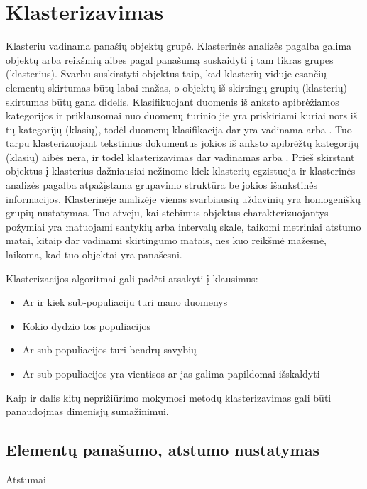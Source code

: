 \documentclass{VUMIFInfKursinis}
\begin{document}
\section{Klasterizavimas}
Klasteriu vadinama panašių objektų grupė. Klasterinės analizės pagalba galima objektų arba reikšmių aibes pagal panašumą suskaidyti į tam tikras grupes (klasterius). Svarbu suskirstyti objektus taip, kad klasterių viduje esančių elementų skirtumas būtų labai mažas, o objektų iš skirtingų grupių (klasterių) skirtumas būtų gana didelis. 
Klasifikuojant duomenis iš anksto apibrėžiamos kategorijos ir priklausomai nuo duomenų turinio jie yra priskiriami kuriai nors iš tų kategorijų (klasių), todėl duomenų klasifikacija dar yra vadinama  arba . Tuo tarpu klasterizuojant tekstinius dokumentus jokios iš anksto apibrėžtų kategorijų (klasių) aibės nėra, ir todėl klasterizavimas dar vadinamas  arba . Prieš skirstant objektus į klasterius dažniausiai nežinome kiek klasterių egzistuoja ir klasterinės analizės pagalba atpažįstama grupavimo struktūra be jokios išankstinės informacijos. 
Klasterinėje analizėje vienas svarbiausių uždavinių yra homogeniškų grupių nustatymas. Tuo atveju, kai stebimus objektus charakterizuojantys požymiai yra matuojami santykių arba intervalų skale, taikomi metriniai atstumo matai, kitaip dar vadinami skirtingumo matais, nes kuo reikšmė mažesnė, laikoma, kad tuo objektai yra panašesni.

Klasterizacijos algoritmai gali padėti atsakyti į klausimus:
\begin{itemize}
	\item Ar ir kiek sub-populiaciju turi mano duomenys
	\item Kokio dydzio tos populiacijos
	\item Ar sub-populiacijos turi bendrų savybių
	\item Ar sub-populiacijos yra vientisos ar jas galima papildomai išskaldyti
\end{itemize}
Kaip ir dalis kitų neprižiūrimo mokymosi metodų klasterizavimas gali būti panaudojmas dimenisjų sumažinimui. 


\subsection{Elementų panašumo, atstumo nustatymas}
Atstumai
\end{document}
